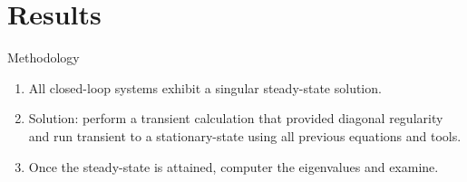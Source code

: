 \documentclass[10pt,t,xcolor=table,compress]{UWMadBeamer}
\begin{document}
    \section{Results}
    \begin{frame}{Methodology}
    \begin{enumerate}
        \item All closed-loop systems exhibit a singular steady-state solution.
        \item Solution: perform a transient calculation that provided diagonal regularity and run transient to a stationary-state using all previous equations and tools.
        \item Once the steady-state is attained, computer the eigenvalues and examine.
    \end{enumerate}
    \end{frame}
\end{document}
